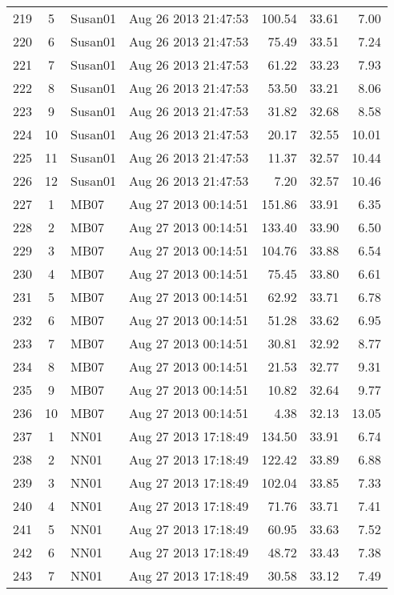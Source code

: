 \documentclass{article}
\begin{document}
\begin{longtable}{ccllrrr}
219 & 5 & Susan01 & Aug 26 2013 21:47:53 & 100.54 & 33.61 & 7.00 \\
220 & 6 & Susan01 & Aug 26 2013 21:47:53 & 75.49 & 33.51 & 7.24 \\
221 & 7 & Susan01 & Aug 26 2013 21:47:53 & 61.22 & 33.23 & 7.93 \\
222 & 8 & Susan01 & Aug 26 2013 21:47:53 & 53.50 & 33.21 & 8.06 \\
223 & 9 & Susan01 & Aug 26 2013 21:47:53 & 31.82 & 32.68 & 8.58 \\
224 & 10 & Susan01 & Aug 26 2013 21:47:53 & 20.17 & 32.55 & 10.01 \\
225 & 11 & Susan01 & Aug 26 2013 21:47:53 & 11.37 & 32.57 & 10.44 \\
226 & 12 & Susan01 & Aug 26 2013 21:47:53 & 7.20 & 32.57 & 10.46 \\
\hline
227 & 1 & MB07 & Aug 27 2013 00:14:51 & 151.86 & 33.91 & 6.35 \\
228 & 2 & MB07 & Aug 27 2013 00:14:51 & 133.40 & 33.90 & 6.50 \\
229 & 3 & MB07 & Aug 27 2013 00:14:51 & 104.76 & 33.88 & 6.54 \\
230 & 4 & MB07 & Aug 27 2013 00:14:51 & 75.45 & 33.80 & 6.61 \\
231 & 5 & MB07 & Aug 27 2013 00:14:51 & 62.92 & 33.71 & 6.78 \\
232 & 6 & MB07 & Aug 27 2013 00:14:51 & 51.28 & 33.62 & 6.95 \\
233 & 7 & MB07 & Aug 27 2013 00:14:51 & 30.81 & 32.92 & 8.77 \\
234 & 8 & MB07 & Aug 27 2013 00:14:51 & 21.53 & 32.77 & 9.31 \\
235 & 9 & MB07 & Aug 27 2013 00:14:51 & 10.82 & 32.64 & 9.77 \\
236 & 10 & MB07 & Aug 27 2013 00:14:51 & 4.38 & 32.13 & 13.05 \\
\hline
237 & 1 & NN01 & Aug 27 2013 17:18:49 & 134.50 & 33.91 & 6.74 \\
238 & 2 & NN01 & Aug 27 2013 17:18:49 & 122.42 & 33.89 & 6.88 \\
239 & 3 & NN01 & Aug 27 2013 17:18:49 & 102.04 & 33.85 & 7.33 \\
240 & 4 & NN01 & Aug 27 2013 17:18:49 & 71.76 & 33.71 & 7.41 \\
241 & 5 & NN01 & Aug 27 2013 17:18:49 & 60.95 & 33.63 & 7.52 \\
242 & 6 & NN01 & Aug 27 2013 17:18:49 & 48.72 & 33.43 & 7.38 \\
243 & 7 & NN01 & Aug 27 2013 17:18:49 & 30.58 & 33.12 & 7.49 \\

\end{longtable}
\end{document}
